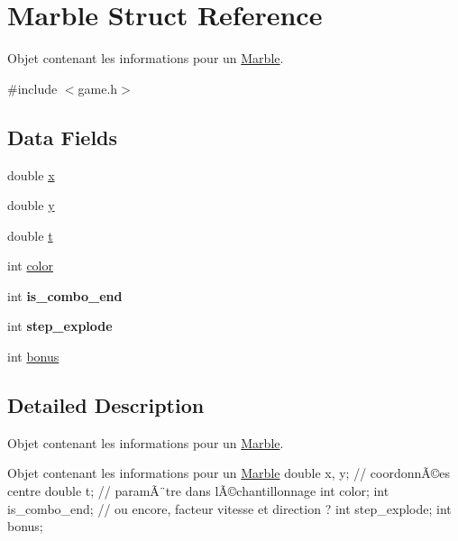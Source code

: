 \hypertarget{struct_marble}{}\section{Marble Struct Reference}
\label{struct_marble}


Objet contenant les informations pour un \hyperlink{struct_marble}{Marble}.  




{\ttfamily \#include $<$game.\+h$>$}

\subsection*{Data Fields}
\begin{DoxyCompactItemize}
\item 
double \hyperlink{struct_marble_af88b946fb90d5f08b5fb740c70e98c10}{x}
\item 
double \hyperlink{struct_marble_ab927965981178aa1fba979a37168db2a}{y}
\item 
double \hyperlink{struct_marble_a87accd1af8e0aff4b818d891374f7cec}{t}
\item 
int \hyperlink{struct_marble_a0fd02fb9277ffcb35a75066ffe95e8c7}{color}
\item 
int {\bfseries is\+\_\+combo\+\_\+end}\hypertarget{struct_marble_a6ac94ef9db7b26b611b521b74e906407}{}\label{struct_marble_a6ac94ef9db7b26b611b521b74e906407}

\item 
int {\bfseries step\+\_\+explode}\hypertarget{struct_marble_adeeb3b358209448342b64c549b46759e}{}\label{struct_marble_adeeb3b358209448342b64c549b46759e}

\item 
int \hyperlink{struct_marble_a21a6e1305c3f396d42ee151e8751b469}{bonus}
\end{DoxyCompactItemize}


\subsection{Detailed Description}
Objet contenant les informations pour un \hyperlink{struct_marble}{Marble}. 

Objet contenant les informations pour un \hyperlink{struct_marble}{Marble} double x, y; // coordonnÃ©es centre double t; // paramÃ¨tre dans l\textquotesingle{}Ã©chantillonnage int color; int is\+\_\+combo\+\_\+end; // ou encore, facteur vitesse et direction ? int step\+\_\+explode; int bonus; 

